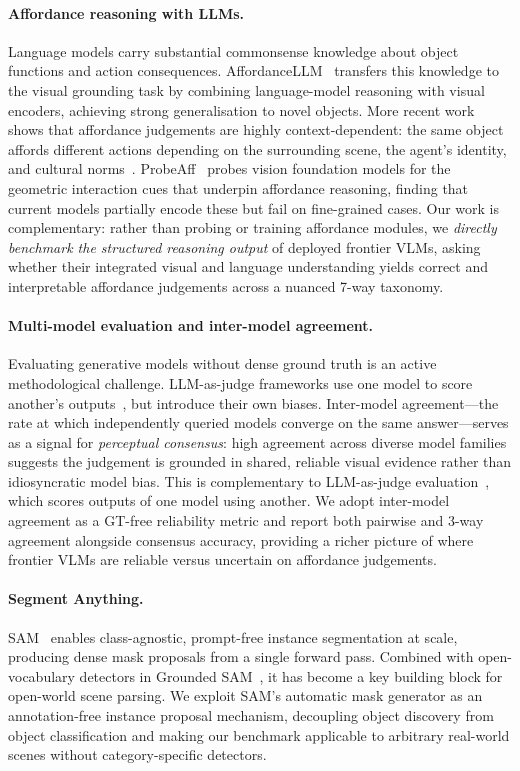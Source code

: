 \documentclass[runningheads]{llncs}
\begin{document}
\paragraph{Affordance reasoning with LLMs.}
Language models carry substantial commonsense knowledge about object
functions and action consequences. AffordanceLLM~\cite{affordancellm}
transfers this knowledge to the visual grounding task by combining
language-model reasoning with visual encoders, achieving strong
generalisation to novel objects. More recent work shows that affordance
judgements are highly context-dependent: the same object affords different
actions depending on the surrounding scene, the agent's identity, and
cultural norms~\cite{context_aff2026}. ProbeAff~\cite{probeaff} probes
vision foundation models for the geometric interaction cues that underpin
affordance reasoning, finding that current models partially encode these
but fail on fine-grained cases. Our work is complementary: rather than
probing or training affordance modules, we \emph{directly benchmark the
structured reasoning output} of deployed frontier VLMs, asking whether
their integrated visual and language understanding yields correct and
interpretable affordance judgements across a nuanced 7-way taxonomy.

\paragraph{Multi-model evaluation and inter-model agreement.}
Evaluating generative models without dense ground truth is an active
methodological challenge. LLM-as-judge frameworks use one model to score
another's outputs~\cite{zheng2023judging}, but introduce their own biases.
Inter-model agreement—the rate at which independently queried models
converge on the same answer—serves as a signal for \emph{perceptual
consensus}: high agreement across diverse model families suggests the
judgement is grounded in shared, reliable visual evidence rather than
idiosyncratic model bias. This is complementary to LLM-as-judge
evaluation~\cite{zheng2023judging}, which scores outputs of one model
using another. We adopt inter-model agreement as a GT-free reliability
metric and report both pairwise and 3-way agreement alongside consensus
accuracy, providing a richer picture of where frontier VLMs are reliable
versus uncertain on affordance judgements.

\paragraph{Segment Anything.}
SAM~\cite{kirillov2023sam} enables class-agnostic, prompt-free instance
segmentation at scale, producing dense mask proposals from a single
forward pass. Combined with open-vocabulary detectors in Grounded
SAM~\cite{grounded_sam}, it has become a key building block for
open-world scene parsing. We exploit SAM's automatic mask generator as an
annotation-free instance proposal mechanism, decoupling object discovery
from object classification and making our benchmark applicable to
arbitrary real-world scenes without category-specific detectors.
\end{document}
